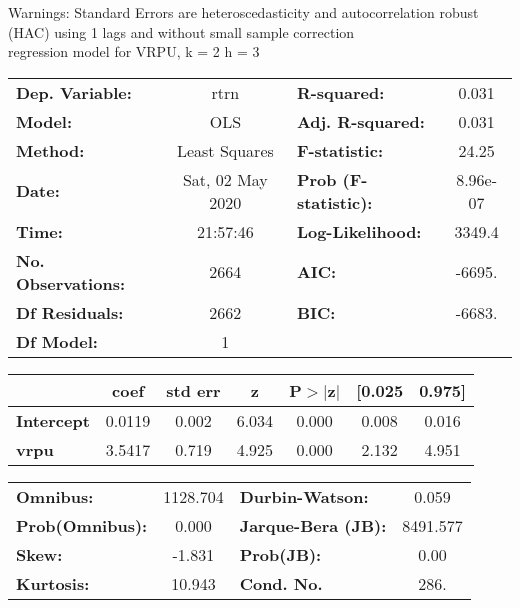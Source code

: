 Warnings: \newline
 [1] Standard Errors are heteroscedasticity and autocorrelation robust (HAC) using 1 lags and without small sample correction\\ 

regression model for VRPU, k = 2 h = 3\begin{center}
\begin{tabular}{lclc}
\toprule
\textbf{Dep. Variable:}    &       rtrn       & \textbf{  R-squared:         } &     0.031   \\
\textbf{Model:}            &       OLS        & \textbf{  Adj. R-squared:    } &     0.031   \\
\textbf{Method:}           &  Least Squares   & \textbf{  F-statistic:       } &     24.25   \\
\textbf{Date:}             & Sat, 02 May 2020 & \textbf{  Prob (F-statistic):} &  8.96e-07   \\
\textbf{Time:}             &     21:57:46     & \textbf{  Log-Likelihood:    } &    3349.4   \\
\textbf{No. Observations:} &        2664      & \textbf{  AIC:               } &    -6695.   \\
\textbf{Df Residuals:}     &        2662      & \textbf{  BIC:               } &    -6683.   \\
\textbf{Df Model:}         &           1      & \textbf{                     } &             \\
\bottomrule
\end{tabular}
\begin{tabular}{lcccccc}
                   & \textbf{coef} & \textbf{std err} & \textbf{z} & \textbf{P$> |$z$|$} & \textbf{[0.025} & \textbf{0.975]}  \\
\midrule
\textbf{Intercept} &       0.0119  &        0.002     &     6.034  &         0.000        &        0.008    &        0.016     \\
\textbf{vrpu}      &       3.5417  &        0.719     &     4.925  &         0.000        &        2.132    &        4.951     \\
\bottomrule
\end{tabular}
\begin{tabular}{lclc}
\textbf{Omnibus:}       & 1128.704 & \textbf{  Durbin-Watson:     } &    0.059  \\
\textbf{Prob(Omnibus):} &   0.000  & \textbf{  Jarque-Bera (JB):  } & 8491.577  \\
\textbf{Skew:}          &  -1.831  & \textbf{  Prob(JB):          } &     0.00  \\
\textbf{Kurtosis:}      &  10.943  & \textbf{  Cond. No.          } &     286.  \\
\bottomrule
\end{tabular}
\end{center}

